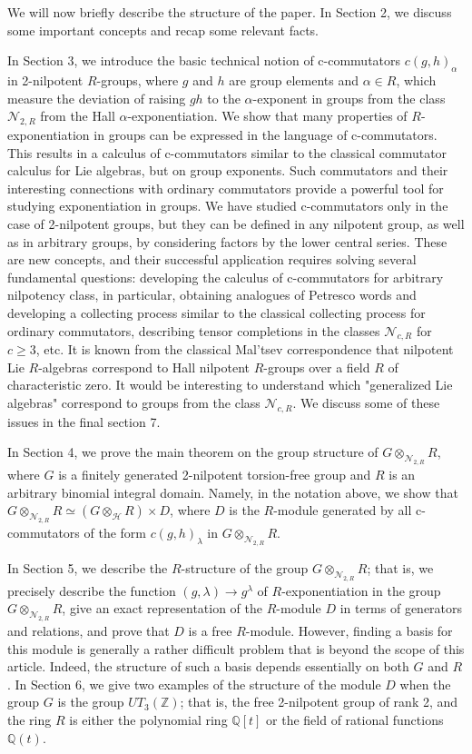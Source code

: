\documentclass[11pt]{article}
\def\N{{\mathbb N}}
\def\N{{\mathcal{N}}}
\theoremstyle{definition}
\begin{document}
We will now briefly describe the structure of the paper. In Section 2, we discuss some important concepts and recap some relevant facts.

In Section 3, we introduce the basic technical notion of c-commutators $c(g,h)_\alpha$ in 2-nilpotent $R$-groups, where $g$ and $h$ are group elements and $\alpha \in R$, which measure the deviation of raising $gh$ to the $\alpha$-exponent in groups from the class $\N_{2,R}$ from the Hall $\alpha$-exponentiation. We show that many properties of $R$-exponentiation in groups can be expressed in the language of c-commutators. This results in a calculus of c-commutators similar to the classical commutator calculus for Lie algebras, but on group exponents. Such commutators and their interesting connections with ordinary commutators provide a powerful tool for studying exponentiation in groups. We have studied c-commutators only in the case of 2-nilpotent groups, but they can be defined in any nilpotent group, as well as in arbitrary groups, by considering factors by the lower central series. These are new concepts, and their successful application requires solving several fundamental questions: developing the calculus of c-commutators for arbitrary nilpotency class, in particular, obtaining analogues of Petresco words and developing a collecting process similar to the classical collecting process for ordinary commutators, describing tensor completions in the classes $\N_{c,R}$ for $c \geq 3$, etc. It is known from the classical Mal'tsev correspondence that nilpotent Lie $R$-algebras correspond to Hall nilpotent $R$-groups over a field $R$ of characteristic zero. It would be interesting to understand which "generalized Lie algebras" correspond to groups from the class $\N_{c,R}$. We discuss some of these issues in the final section 7.

In Section 4, we prove the main theorem on the group structure of $G \otimes_{\N_{2,R}} R$, where $G$ is a finitely generated 2-nilpotent torsion-free group and $R$ is an arbitrary binomial integral domain. Namely, in the notation above, we show that $G\otimes_{\N_{2,R}} R \simeq (G \otimes_{\mathcal{H}} R) \times D$, where $D$ is the $R$-module generated by all c-commutators of the form $c(g,h)_\lambda$ in $G \otimes_{\N_{2,R}} R$.

In Section 5, we describe the $R$-structure of the group $G \otimes_{\N_{2,R}} R$; that is, we precisely describe the function $(g,\lambda) \to g^\lambda$ of $R$-exponentiation in the group $G \otimes_{\N_{2,R}} R$, give an exact representation of the $R$-module $D$ in terms of generators and relations, and prove that $D$ is a free $R$-module. However, finding a basis for this module is generally a rather difficult problem that is beyond the scope of this article. Indeed, the structure of such a basis depends essentially on both $G$ and $R$.
In Section 6, we give two examples of the structure of the module $D$ when the group $G$ is the group $UT_3(\mathbb Z)$; that is, the free 2-nilpotent group of rank 2, and the ring $R$ is either the polynomial ring $\mathbb{Q}[t]$ or the field of rational functions $\mathbb{Q}(t)$.
\end{document}
